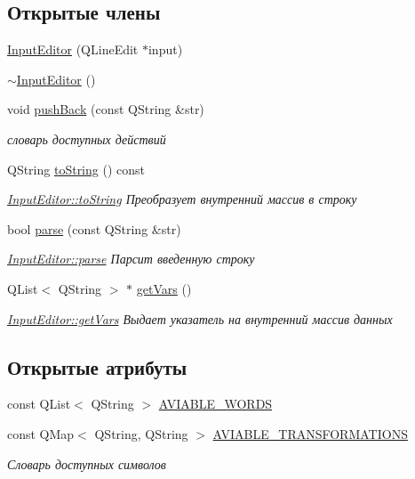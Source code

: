 \subsection*{Открытые члены}
\begin{DoxyCompactItemize}
\item 
\hyperlink{class_input_editor_ac9aae2a915a58eae586aa373c1b1f635}{Input\+Editor} (Q\+Line\+Edit $\ast$input)
\item 
\hyperlink{class_input_editor_aec1a586153ea14380867eff2c7605bec}{$\sim$\+Input\+Editor} ()
\item 
void \hyperlink{class_input_editor_a4b357e281c2d9cf669ed4a03c8de5190}{push\+Back} (const Q\+String \&str)
\begin{DoxyCompactList}\small\item\em словарь доступных действий \end{DoxyCompactList}\item 
Q\+String \hyperlink{class_input_editor_ab65dc1f4a87be3abf8bfff14c1a54532}{to\+String} () const
\begin{DoxyCompactList}\small\item\em \hyperlink{class_input_editor_ab65dc1f4a87be3abf8bfff14c1a54532}{Input\+Editor\+::to\+String} Преобразует внутренний массив в строку \end{DoxyCompactList}\item 
bool \hyperlink{class_input_editor_ad9a9e03d439e909c6d72775ef78d9814}{parse} (const Q\+String \&str)
\begin{DoxyCompactList}\small\item\em \hyperlink{class_input_editor_ad9a9e03d439e909c6d72775ef78d9814}{Input\+Editor\+::parse} Парсит введенную строку \end{DoxyCompactList}\item 
Q\+List$<$ Q\+String $>$ $\ast$ \hyperlink{class_input_editor_a3f69e5b7fe43e31f2a4f783fbdc8072e}{get\+Vars} ()
\begin{DoxyCompactList}\small\item\em \hyperlink{class_input_editor_a3f69e5b7fe43e31f2a4f783fbdc8072e}{Input\+Editor\+::get\+Vars} Выдает указатель на внутренний массив данных \end{DoxyCompactList}\end{DoxyCompactItemize}
\subsection*{Открытые атрибуты}
\begin{DoxyCompactItemize}
\item 
const Q\+List$<$ Q\+String $>$ \hyperlink{class_input_editor_a2c1e4bffaceced12c4f13e3f19a80fb7}{A\+V\+I\+A\+B\+L\+E\+\_\+\+W\+O\+R\+DS}
\item 
const Q\+Map$<$ Q\+String, Q\+String $>$ \hyperlink{class_input_editor_a328642e3ae078e059dc95bb4f945451c}{A\+V\+I\+A\+B\+L\+E\+\_\+\+T\+R\+A\+N\+S\+F\+O\+R\+M\+A\+T\+I\+O\+NS}
\begin{DoxyCompactList}\small\item\em Словарь доступных символов \end{DoxyCompactList}\end{DoxyCompactItemize}


